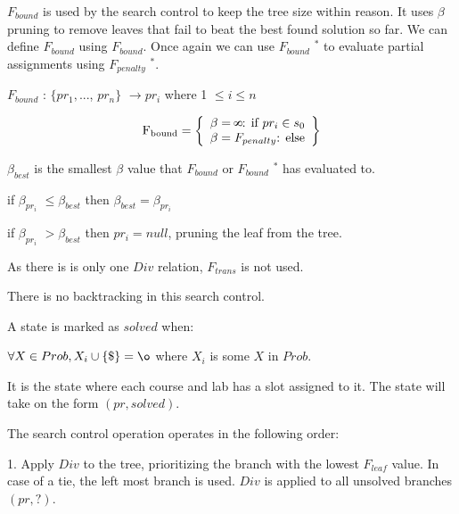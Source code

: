 \documentclass[10pt]{article}
\def\infinity{\rotatebox{90}{8}}
\begin{document}
\bigskip
\bigskip


$F_{bound}$ is used by the search control to keep the tree size within reason. It uses $\beta$ pruning to remove leaves that fail to beat the best found solution so far.
We can define $F_{bound}$ using $F_{bound}$. Once again we can use $F_{bound}$ $^*$ to evaluate partial assignments using $F_{penalty}$ $^*$.

\bigskip
$F_{bound}$ : $\{pr_1, ...$, $pr_n \} $  $ \to pr_i $    where 1 $\leq i\leq n$

 \[
          \text{F\textsubscript{bound}} = \left\{\begin{array}{ll}
            \beta = \infinity $: if $pr_i \in s_0 \\
           \beta = F_{penalty} $: else$\\
            
            \end{array}\right\}
      \]
      
\bigskip

$\beta _{best}$ is the smallest $\beta$ value that $F_{bound}$ or  $F_{bound}$ $^*$ has evaluated to.


if $\beta _{pr_i}$ $\leq \beta _{best}$ then $\beta_ {best} = \beta _{pr_i } $


if $\beta _{pr_i}$  $> \beta _{best}$ then  $pr_i = null$, pruning the leaf from the tree.




\bigskip
\bigskip

As there is is only one $Div$ relation, $F_{trans}$ is not used. 

There is no backtracking in this search control.

\bigskip
\bigskip
\bigskip
A state is marked as $solved$ when:

\bigskip 

$\forall X \in Prob, X_i \cup \{ \$ \} = \o $ where $X_i$ is some $X$ in $Prob$.

It is the state where each course and lab has a slot assigned to it. The state will take on the form $(pr, solved)$.
\bigskip
\bigskip
\bigskip

The search control operation operates in the following order:

\bigskip


1. Apply $Div$ to the tree, prioritizing the branch with the lowest $F_{leaf}$ value. In case of a tie, the left most branch is used. $Div$ is applied to all unsolved branches $(pr, ?)$. 
\end{document}
